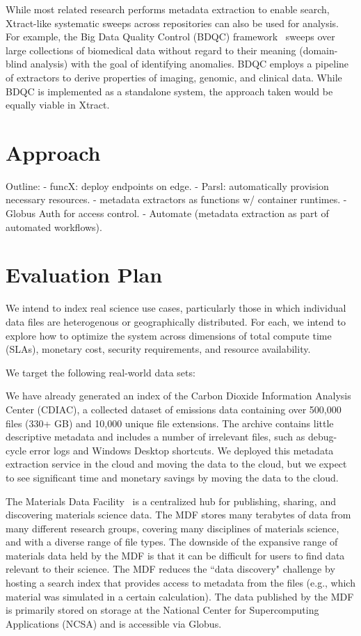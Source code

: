 \documentclass[sigconf]{acmart}
\newcommand{\name}{Xtract}
\begin{document}
{While most related research performs metadata extraction to enable search,
\name{}-like systematic sweeps across repositories can also be used for analysis.  
For example, the Big Data Quality Control (BDQC) framework~\cite{deutsch2018bdqc} sweeps over 
large collections of biomedical data without regard to their meaning (domain-blind analysis) with the goal of
identifying anomalies.
BDQC employs a pipeline of extractors to derive properties of imaging, genomic, and clinical data.
While BDQC is implemented as a standalone system, the approach taken would be equally 
viable in \name{}.

\section{Approach}
\label{sec:approach}
Outline: 
- funcX: deploy endpoints on edge. 
     - Parsl: automatically provision necessary resources. 
- metadata extractors as functions w/ container runtimes. 
- Globus Auth for access control. 
- Automate (metadata extraction as part of automated workflows). 

\section{Evaluation Plan}
\label{sec:eval}

We intend to index real science use cases, particularly those in which individual data files are heterogenous 
or geographically distributed. For each, we intend to explore how to optimize the system across dimensions of 
total compute time (SLAs), monetary cost, security requirements, and resource availability.

We target the following real-world data sets: 

We have already generated an index of the Carbon Dioxide Information Analysis Center (CDIAC), a collected dataset of 
emissions data containing over 500,000 files (330+ GB) and 10,000 unique file extensions. The archive contains little 
descriptive metadata and includes a number of irrelevant files, such as debug-cycle error logs and Windows Desktop 
shortcuts.  We deployed this metadata extraction service in the cloud and moving the data to the cloud, but we expect 
to see significant time and monetary savings by moving the data to the cloud.  

The Materials Data Facility~\cite{blaiszik2016materials, blaiszik2019mdf}
is a centralized hub for publishing, sharing, and discovering materials science data. 
The MDF stores many terabytes of data from many different research groups, covering many disciplines of 
materials science, and with a diverse range of file types.
The downside of the expansive range of materials data held by the MDF 
is that it can be difficult for users to find data relevant to their science.
The MDF reduces the ``data discovery" challenge by hosting a search index that provides access to metadata from the 
files (e.g., which material was simulated in a certain calculation).
The data published by the MDF is primarily stored on storage at the National Center for Supercomputing Applications
(NCSA) and is accessible via Globus.  

}
\end{document}
